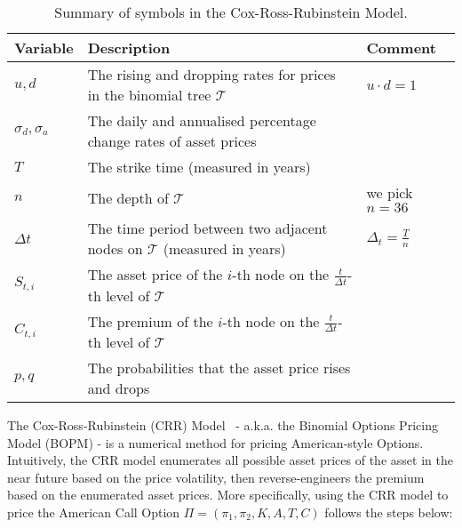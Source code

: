 \renewcommand{\arraystretch}{1.2}
\begin{table}[]
\centering
\caption{Summary of symbols in the Cox-Ross-Rubinstein Model.}
\label{table:summary_symbols_crr}
\footnotesize
\begin{tabular}{|p{1cm}|p{4cm}|p{1.5cm}|}
\hline
Variable             & Description                                                                               & Comment                  \\\hline
$u, d$               & The rising and dropping rates for prices in the binomial tree $\mathcal{T}$                & $u \cdot d = 1$          \\\hline
$\sigma_d, \sigma_a$ & The daily and annualised percentage change rates of asset prices                          &                          \\\hline
$T$                  & The strike time (measured in years)                                                       &                          \\\hline
$n$                  & The depth of $\mathcal{T}$                                                                & we pick $n = 36$         \\\hline
$\Delta t$           & The time period between two adjacent nodes on $\mathcal{T}$ (measured in years)           & $\Delta_t = \frac{T}{n}$ \\\hline
$S_{t, i}$           & The asset price of the $i$-th node on the $\frac{t}{\Delta t}$-th level of $\mathcal{T}$  &                          \\\hline
$C_{t, i}$           & The premium of the $i$-th node on the $\frac{t}{\Delta t}$-th level of $\mathcal{T}$ &                          \\\hline
$p, q$               & The probabilities that the asset price rises and drops                                    &                          \\\hline
\end{tabular}%

\end{table}



The Cox-Ross-Rubinstein (CRR) Model~\cite{cox1979option} - a.k.a. the Binomial Options Pricing Model (BOPM) - is a numerical method for pricing American-style Options.
Intuitively, the CRR model enumerates all possible asset prices of the asset in the near future based on the price volatility,
then reverse-engineers the premium based on the enumerated asset prices.
More specifically, using the CRR model to price the American Call Option $\Pi = (\pi_1, \pi_2, K, A, T, C)$ follows the steps below:


